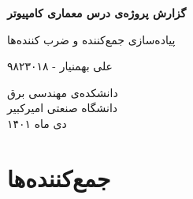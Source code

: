 \documentclass{article}
\begin{document}
\begin{titlepage}
   \begin{center}
   \Large
       \vspace*{1cm}

       \textbf{گزارش پروژه‌ی درس معماری کامپیوتر}

       \vspace{0.5cm}
      پیاده‌سازی جمع‌کننده و ضرب کننده‌ها        
      
       \vspace{1.5cm}
       {علی بهمنیار - ۹۸۲۳۰۱۸}
       \vfill
 
       \vspace{0.8cm}
     	\begin{figure}[H]%
	   	 	\centering
	    	\quad
		\end{figure}
            
       دانشکده‌ی مهندسی برق\\
       دانشگاه صنعتی امیرکبیر\\
       دی ماه ۱۴۰۱       
   \end{center}
\end{titlepage}

\pagebreak
\tableofcontents
\pagebreak

\section{جمع‌کننده‌ها}
\end{document}
